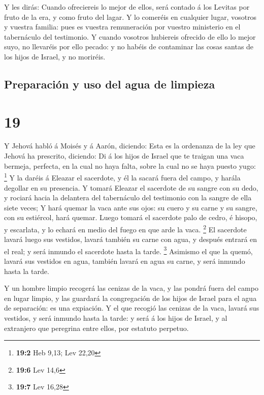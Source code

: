  Y les dirás: Cuando ofreciereis lo mejor de ellos, será
contado á los Levitas por fruto de la era, y como fruto del lagar.
 Y lo comeréis en cualquier lugar, vosotros y vuestra
familia: pues es vuestra remuneración por vuestro ministerio en el
tabernáculo del testimonio.  Y cuando vosotros hubiereis
ofrecido de ello lo mejor suyo, no llevaréis por ello pecado: y no
habéis de contaminar las cosas santas de los hijos de Israel, y no
moriréis.

\hypertarget{preparaciuxf3n-y-uso-del-agua-de-limpieza}{%
\subsection{Preparación y uso del agua de
limpieza}\label{preparaciuxf3n-y-uso-del-agua-de-limpieza}}

\hypertarget{section-18}{%
\section{19}\label{section-18}}

 Y Jehová habló á Moisés y á Aarón, diciendo:
 Esta es la ordenanza de la ley que Jehová ha prescrito,
diciendo: Di á los hijos de Israel que te traigan una vaca bermeja,
perfecta, en la cual no haya falta, sobre la cual no se haya puesto
yugo: \footnote{\textbf{19:2} Heb 9,13; Lev 22,20}  Y la
daréis á Eleazar el sacerdote, y él la sacará fuera del campo, y harála
degollar en su presencia.  Y tomará Eleazar el sacerdote
de su sangre con su dedo, y rociará hacia la delantera del tabernáculo
del testimonio con la sangre de ella siete veces;  Y hará
quemar la vaca ante sus ojos: su cuero y su carne y su sangre, con su
estiércol, hará quemar.  Luego tomará el sacerdote palo de
cedro, é hisopo, y escarlata, y lo echará en medio del fuego en que arde
la vaca. \footnote{\textbf{19:6} Lev 14,6}  El sacerdote
lavará luego sus vestidos, lavará también su carne con agua, y después
entrará en el real; y será inmundo el sacerdote hasta la tarde.
\footnote{\textbf{19:7} Lev 16,28}  Asimismo el que la
quemó, lavará sus vestidos en agua, también lavará en agua su carne, y
será inmundo hasta la tarde.

 Y un hombre limpio recogerá las cenizas de la vaca, y las
pondrá fuera del campo en lugar limpio, y las guardará la congregación
de los hijos de Israel para el agua de separación: es una expiación.
 Y el que recogió las cenizas de la vaca, lavará sus
vestidos, y será inmundo hasta la tarde: y será á los hijos de Israel, y
al extranjero que peregrina entre ellos, por estatuto perpetuo.

